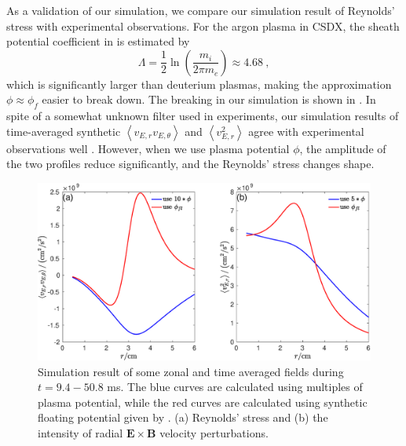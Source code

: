 \documentclass[aps,pre,twocolumn,superscriptaddress]{revtex4-2}
\begin{document}
As a validation of our simulation, we compare our simulation result of Reynolds' stress with experimental observations. For the argon plasma in CSDX, the sheath potential coefficient in  is estimated by \cite{Nie_2018}
\begin{equation}
	\Lambda=\frac{1}{2}\ln\left(\frac{m_{i}}{2\pi m_{e}}\right)\approx 4.68~,
\label{eq:Lamda}
\end{equation}
which is significantly larger than deuterium plasmas, making the approximation $\phi\approx\phi_{f}$ easier to break down. The breaking in our simulation is shown in . In spite of a somewhat unknown filter used in experiments, our simulation results of time-averaged synthetic $\left<v_{E,r}v_{E,\theta}\right>$ and $\left<v_{E,r}^{2}\right>$ agree with experimental observations well \cite{doi:10.1063/1.2985836,PhysRevLett.104.065002}. However, when we use plasma potential $\phi$, the amplitude of the two profiles reduce significantly, and the Reynolds' stress changes shape.

\begin{figure}[htb]
	\includegraphics[width=3.375 in]{comp_pl_fl.eps}
	\caption{
		Simulation result of some zonal and time averaged fields during $t=9.4-50.8$ ms. The blue curves are calculated using multiples of plasma potential, while the red curves are calculated using synthetic floating potential given by . (a) Reynolds' stress and (b) the intensity of radial $\bm{E}\times\bm{B}$ velocity perturbations.
		\label{fig:comp_pl_fl}	
	}
\end{figure}



\end{document}

